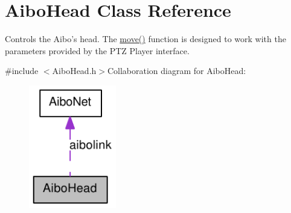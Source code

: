 \hypertarget{classAiboHead}{
\section{AiboHead Class Reference}
\label{classAiboHead}
}


Controls the Aibo's head. The \hyperlink{classAiboHead_adf0f91fafeaa5e32b5e387ac136e0f37}{move()} function is designed to work with the parameters provided by the PTZ Player interface.  


{\ttfamily \#include $<$AiboHead.h$>$}Collaboration diagram for AiboHead:\nopagebreak
\begin{figure}[H]
\begin{center}
\leavevmode
\includegraphics[width=108pt]{classAiboHead__coll__graph}
\end{center}
\end{figure}
